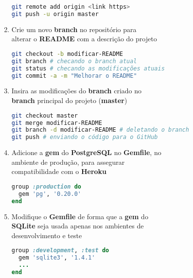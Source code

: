 \documentclass[a4paper,12pt]{article}
\begin{document}
\begin{enumerate}
    \begin{lstlisting}[language=Bash]
git remote add origin <link https>
git push -u origin master
    \end{lstlisting}

  \item Crie um novo \textbf{branch} no repositório para \\
        alterar o \textbf{README} com a descrição do projeto

    \begin{lstlisting}[language=Bash, commentstyle=\color{gray}]
git checkout -b modificar-README
git branch # checando o branch atual
git status # checando as modificações atuais
git commit -a -m "Melhorar o README"
    \end{lstlisting}

  \item Insira as modificações do \textbf{branch} criado no \\
        \textbf{branch} principal do projeto (\textbf{master})

    \begin{lstlisting}[language=Bash, commentstyle=\color{gray}]
git checkout master
git merge modificar-README
git branch -d modificar-README # deletando o branch
git push # enviando o código para o GitHub
    \end{lstlisting}

  \item Adicione a \textbf{gem} do \textbf{PostgreSQL} no \textbf{Gemfile}, no \\
        ambiente de produção, para assegurar \\
        compatibilidade com o \textbf{Heroku}

    \begin{lstlisting}[language=Ruby, title=Gemfile]
group :production do
  gem 'pg', '0.20.0'
end
    \end{lstlisting}

  \item Modifique o \textbf{Gemfile} de forma que a \textbf{gem} do \\
        \textbf{SQLite} seja usada apenas nos ambientes de \\
        desenvolvimento e teste

    \begin{lstlisting}[language=Ruby, title=Gemfile]
group :development, :test do
  gem 'sqlite3', '1.4.1'
  ...
end
    \end{lstlisting}


\end{enumerate}
\end{document}
